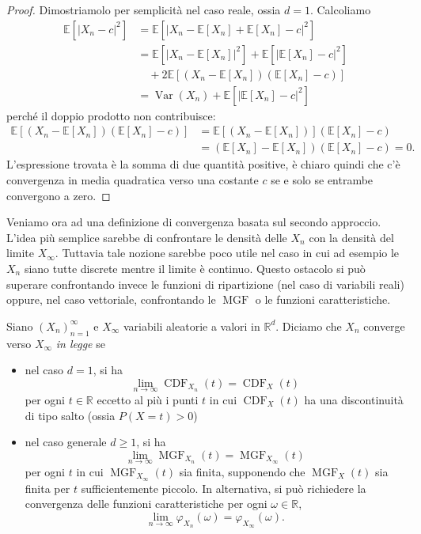 \documentclass[
  italian,
  letterpaper,
]{book}
\newcommand{\bra}[1]{\left( #1 \right)}
\newcommand{\sqa}[1]{\left[ #1 \right]}
\newcommand{\R}{\mathbb{R}}
\newcommand{\E}[1]{\mathbb{E}\sqa{#1}}
\newcommand{\Var}[1]{\operatorname{Var}\bra{#1}}
\newcommand{\CDF}{\operatorname{CDF}}
\newcommand{\MGF}{\operatorname{MGF}}
\theoremstyle{definition}
\theoremstyle{remark}
\begin{document}
\begin{proof}
Dimostriamolo per semplicità nel caso reale, ossia \(d=1\). Calcoliamo
\[ \begin{split} \E{ |X_n - c|^2 } & = \E{ |X_n - \E{X_n} + \E{X_n} - c|^2 } \\
& = \E{ |X_n - \E{X_n}|^2 } + \E{|\E{X_n} - c|^2 } \\
& \quad + 2 \E{ (X_n - \E{X_n})(\E{X_n} - c)}\\
& = \Var{X_n} + \E{|\E{X_n} - c|^2 }
\end{split}\] perché il doppio prodotto non contribuisce:
\[ \begin{split} \E{ (X_n - \E{X_n})(\E{X_n} - c)} &  = \E{ (X_n - \E{X_n})} (\E{X_n} - c) \\
& = (  \E{X_n} - \E{X_n}) (\E{X_n} - c) = 0.
\end{split}\] L'espressione trovata è la somma di due quantità positive,
è chiaro quindi che c'è convergenza in media quadratica verso una
costante \(c\) se e solo se entrambe convergono a zero.
\end{proof}

Veniamo ora ad una definizione di convergenza basata sul secondo
approccio. L'idea più semplice sarebbe di confrontare le densità delle
\(X_n\) con la densità del limite \(X_\infty\). Tuttavia tale nozione
sarebbe poco utile nel caso in cui ad esempio le \(X_n\) siano tutte
discrete mentre il limite è continuo. Questo ostacolo si può superare
confrontando invece le funzioni di ripartizione (nel caso di variabili
reali) oppure, nel caso vettoriale, confrontando le
\(\operatorname{MGF}\) o le funzioni caratteristiche.

Siano \((X_n)_{n=1}^\infty\) e \(X_\infty\) variabili aleatorie a valori
in \(\R^d\). Diciamo che \(X_n\) converge verso \(X_\infty\) \emph{in
legge} se

\begin{itemize}
\item
  nel caso \(d=1\), si ha
  \[ \lim_{n \to \infty} \CDF_{X_n}(t)  = \CDF_X(t)\] per ogni
  \(t \in \R\) eccetto al più i punti \(t\) in cui \(\CDF_X(t)\) ha una
  discontinuità di tipo salto (ossia \(P(X=t)>0\))
\item
  nel caso generale \(d \ge 1\), si ha
  \[  \lim_{n \to \infty} \MGF_{X_n}(t)  = \MGF_{X_\infty}(t)\] per ogni
  \(t\) in cui \(\MGF_{X_\infty}(t)\) sia finita, supponendo che
  \(\MGF_X(t)\) sia finita per \(t\) sufficientemente piccolo. In
  alternativa, si può richiedere la convergenza delle funzioni
  caratteristiche per ogni \(\omega \in \R\),
  \[ \lim_{n \to \infty} \varphi_{X_n}(\omega) =\varphi_{X_\infty}(\omega).\]
\end{itemize}
\end{document}
